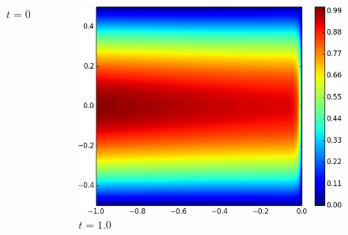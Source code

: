 \documentclass[18pt,xcolor=table]{beamer}
\begin{document}
\begin{frame}[t]
\begin{columns}[t]
\begin{column}{0.3\textwidth}
\begin{figure}[t]
$t=0.5$
\end{figure}
\end{column}
\begin{column}{0.3\textwidth}
\begin{figure}[t]
\centering
\includegraphics[width=\textwidth]{Confusion/Robustness/2d_problem_t_=_10.png}\\
$t=1.0$
\end{figure}
\end{column}
\end{columns}
\end{frame}
\end{document}
